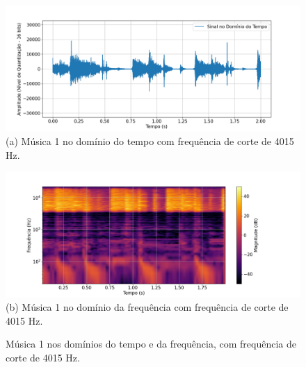 \begin{figure}[htpb]
    \centering
    \begin{minipage}[b]{0.7\textwidth}
        \centering
        \includegraphics[width=\textwidth]{figuras/fig85.png}
        \vspace{0.3cm} %
        (a) Música 1 no domínio do tempo com frequência de corte de 4015 Hz.
    \end{minipage}
    \hspace{0.5cm} %

    \begin{minipage}[b]{0.7\textwidth}
        \centering
        \includegraphics[width=\textwidth]{figuras/fig86.png}
        \vspace{0.3cm} %
        (b) Música 1 no domínio da frequência com frequência de corte de 4015 Hz.
    \end{minipage}

    \caption{Música 1 nos domínios do tempo e da frequência, com frequência de corte de 4015 Hz.}
    \label{fig85}
\end{figure}

